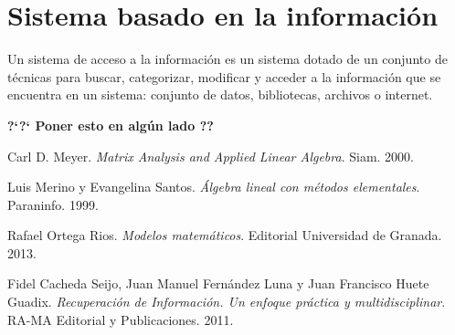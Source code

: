 \documentclass[size=a4, parskip=half, titlepage=false, toc=flat, toc=bib, 12pt]{scrartcl}
\theoremstyle{theorem-style}
\theoremstyle{definition-style}
\theoremstyle{remark-style}
\theoremstyle{example-style}
\theoremstyle{definition-style}
\theoremstyle{remark-style}
\begin{document}
\newpage

\section{Sistema basado en la información}
Un sistema de acceso a la información es un sistema dotado de un conjunto de técnicas para buscar, categorizar, modificar y acceder a la información que se encuentra en un sistema: conjunto de datos, bibliotecas, archivos o internet.

\textbf{?`?` Poner esto en algún lado ??}


\newpage

\begin{thebibliography}{9}
Carl D. Meyer.
\textit{Matrix Analysis and Applied Linear Algebra}. Siam. 2000.

Luis Merino y Evangelina Santos.
\textit{Álgebra lineal con métodos elementales}. Paraninfo. 1999.

Rafael Ortega Rios.
\textit{Modelos matemáticos}. Editorial Universidad de Granada. 2013.

Fidel Cacheda Seijo, Juan Manuel Fernández Luna y Juan Francisco Huete Guadix.
\textit{Recuperación de Información. Un enfoque práctica y multidisciplinar}. RA-MA Editorial y Publicaciones. 2011.

\end{thebibliography}
\end{document}

